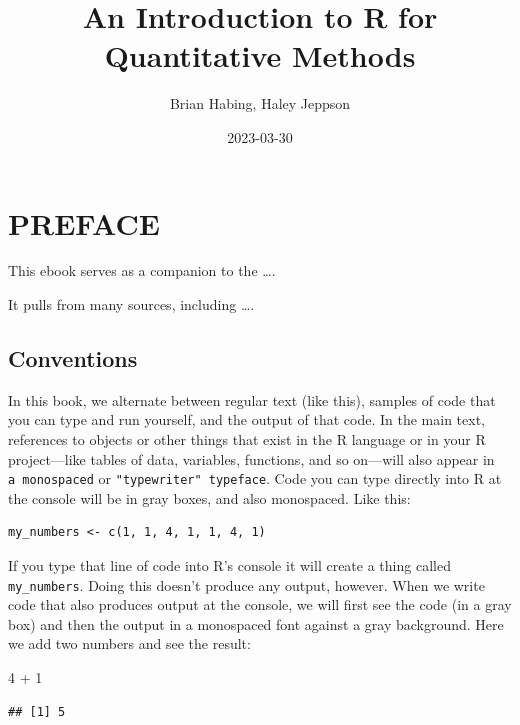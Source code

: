\documentclass[
]{book}
\title{An Introduction to R for Quantitative Methods}
\author{Brian Habing, Haley Jeppson}
\date{2023-03-30}
\newenvironment{Shaded}{\begin{snugshade}}{\end{snugshade}}
\newcommand{\DecValTok}[1]{\textcolor[rgb]{0.00,0.00,0.81}{#1}}
\newcommand{\SpecialCharTok}[1]{\textcolor[rgb]{0.00,0.00,0.00}{#1}}
\begin{document}
\maketitle

{
\setcounter{tocdepth}{1}
\tableofcontents
}
\hypertarget{preface}{%
\chapter*{PREFACE}\label{preface}}

This ebook serves as a companion to the \ldots.

It pulls from many sources, including \ldots.

\hypertarget{conventions}{%
\section*{Conventions}\label{conventions}}

In this book, we alternate between regular text (like this), samples of code that you can type and run yourself, and the output of that code. In the main text, references to objects or other things that exist in the R language or in your R project---like tables of data, variables, functions, and so on---will also appear in \texttt{a\ monospaced} or \texttt{"typewriter"\ typeface}. Code you can type directly into R at the console will be in gray boxes, and also monospaced. Like this:

\begin{verbatim}
my_numbers <- c(1, 1, 4, 1, 1, 4, 1)
\end{verbatim}

If you type that line of code into R's console it will create a thing called \texttt{my\_numbers}. Doing this doesn't produce any output, however. When we write code that also produces output at the console, we will first see the code (in a gray box) and then the output in a monospaced font against a gray background. Here we add two numbers and see the result:

\begin{Shaded}
\begin{Highlighting}[]
\DecValTok{4} \SpecialCharTok{+} \DecValTok{1}
\end{Highlighting}
\end{Shaded}

\begin{verbatim}
## [1] 5
\end{verbatim}
\end{document}
